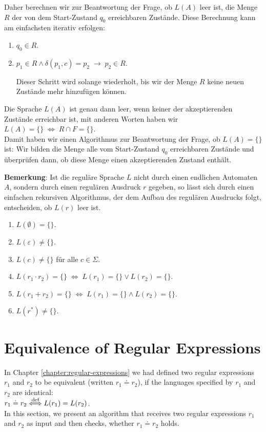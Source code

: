 Daher berechnen wir zur Beantwortung der Frage, ob $L(A)$ leer ist,
die Menge $R$ der von dem Start-Zustand $q_0$ erreichbaren Zust\"ande.  Diese Berechnung
kann am einfachsten iterativ erfolgen:
\begin{enumerate}
\item $q_0 \in R$.
\item $p_1 \in R \wedge \delta(p_1,c) = p_2 \;\rightarrow\; p_2 \in R$.

      Dieser Schritt wird solange wiederholt, bis wir der Menge $R$ keine neuen Zust\"ande
      mehr hinzuf\"ugen k\"onnen.
\end{enumerate}
Die Sprache $L(A)$ ist genau dann leer, wenn keiner der akzeptierenden Zust\"ande erreichbar
ist, mit anderen Worten haben wir
\\[0.2cm]
\hspace*{1.3cm}
$L(A) = \{\} \;\Leftrightarrow\; R \cap F = \{\}$.
\\[0.2cm]
Damit haben wir einen Algorithmus zur Beantwortung der Frage, ob $L(A) = \{\}$ ist:
Wir bilden die Menge alle vom Start-Zustand $q_0$ erreichbaren Zust\"ande und \"uberpr\"ufen
dann, ob diese Menge einen akzeptierenden Zustand enth\"alt.
\vspace*{0.3cm}

\noindent
\textbf{Bemerkung}:  Ist die regul\"are Sprache $L$ nicht durch einen endlichen Automaten $A$,
sondern durch einen regul\"aren Ausdruck $r$ gegeben, so l\"asst sich durch einen einfachen
rekursiven Algorithmus, der dem Aufbau des regul\"aren Ausdrucks folgt, entscheiden, ob
$L(r)$ leer ist.
\begin{enumerate}
\item $L(\emptyset) = \{\}$.
\item $L(\varepsilon) \not= \{\}$.
\item $L(c) \not= \{\}$ \quad f\"ur alle $c \in \Sigma$.
\item $L(r_1 \cdot r_2) = \{\} \;\Leftrightarrow\; L(r_1) = \{\} \vee L(r_2) = \{\}$.
\item $L(r_1 + r_2) = \{\} \;\Leftrightarrow\; L(r_1) = \{\} \wedge L(r_2) = \{\}$.
\item $L(r^*) \not= \{\}$.
\end{enumerate}


\section{Equivalence of Regular Expressions}
In Chapter \ref{chapter:regular-expressions} we had defined two regular expressions $r_1$ and $r_2$ to be equivalent 
(written $r_1 \doteq r_2$), if the languages specified by $r_1$ and $r_2$ are identical:
\\[0.2cm]
\hspace*{1.3cm}
$r_1 \doteq r_2 \stackrel{\mbox{\scriptsize def}}{\Longleftrightarrow} L(r_1) = L(r_2)$. 
\\[0.2cm]
In this section, we present an algorithm that receives two regular expressions $r_1$ and $r_2$ as input and then
checks, whether $r_1 \doteq r_2$ holds. 



